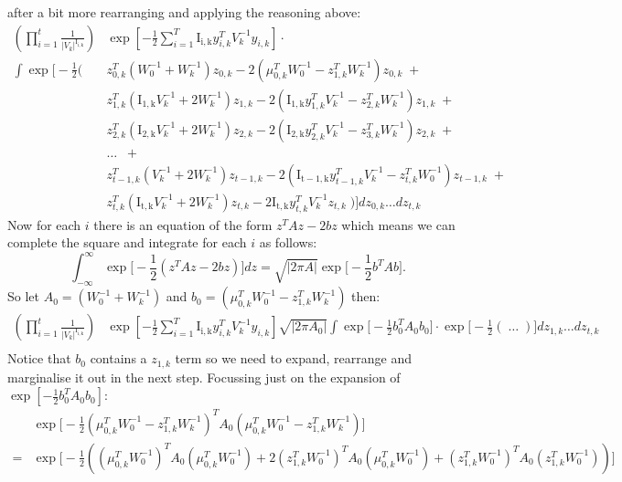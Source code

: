 \documentclass{standalone}
\newcommand{\yik}[1]{y_{#1, k}}
\newcommand{\zik}[1]{z_{#1, k}}
\newcommand{\mik}[1]{\mu_{#1, k}}
\newcommand{\vk}{V_k}
\newcommand{\Ik}[1]{\operatorname{I_{#1, k}}}
\newcommand{\ivk}[1]{V_{#1}^{-1}}
\newcommand{\iwk}[1]{W_{#1}^{-1}}
\DeclareMathOperator{\lint}{\displaystyle\int}
\DeclareMathOperator{\lprod}{\displaystyle\prod}
\begin{document}
after a bit more rearranging and applying the reasoning above:
\begin{align*}
 \left( \lprod_{i = 1}^t \frac{1}{|\vk|^{\Ik{i}}} \right) & \exp \left[-\frac{1}{2} \sum_{i = 1}^T \Ik{i} \yik{i}^T \ivk{k} \yik{i} \right] \cdot \\ 
 \lint \exp \biggl[ -\frac{1}{2} \biggl( & \zik{0}^T \left( \iwk{0} + \iwk{k} \right) \zik{0} - 2 \left(\mik{0}^T \iwk{0}-\zik{1}^T \iwk{k} \right) \zik{0}\; +  \\
 & \zik{1}^T \left(\Ik{1} \ivk{k} + 2 \iwk{k} \right) \zik{1} - 2 \left(\Ik{1} \yik{1}^T \ivk{k} - \zik{2}^T \iwk{k} \right) \zik{1}\; +  \\ 
 & \zik{2}^T \left(\Ik{2} \ivk{k} + 2 \iwk{k} \right) \zik{2} - 2 \left( \Ik{2} \yik{2}^T \ivk{k} - \zik{3}^T \iwk{k} \right) \zik{2}\; +  \\ 
 & \dots \; \; + \\
 & \zik{t-1}^T \left(\ivk{k} + 2 \iwk{k} \right) \zik{t-1} - 2 \left(\Ik{t-1} \yik{t-1}^T \ivk{k} - \zik{t}^T \iwk{0} \right) \zik{t-1}\; +  \\ 
 & \zik{t}^T \left(\Ik{t} \ivk{k} + 2 \iwk{k} \right) \zik{t} - 2 \Ik{t} \yik{t}^T \ivk{k} \zik{t} \; \biggr) \biggr]d\zik{0} \dots d\zik{t}
\end{align*}
Now for each $i$ there is an equation of the form $z^T A z - 2bz$ which means we can complete the square and integrate for each $i$ as follows:
\begin{equation}
\label{eq:comp_sq}
\int_{-\infty}^{\infty} \exp \bigg[-\frac{1}{2} \left(z^T A z - 2bz \right) \bigg]dz = \sqrt{|2 \pi A|} \exp \bigg[-\frac{1}{2} b^T A b \bigg]. 
\end{equation}
So let $A_0 = \left( \iwk{0} + \iwk{k} \right)$ and $b_0 = \left(\mik{0}^T \iwk{0}-\zik{1}^T \iwk{k} \right)$ then:
\begin{align*}
\left( \lprod_{i = 1}^t \frac{1}{|\vk|^{\Ik{i}}} \right) & \exp \left[-\frac{1}{2} \sum_{i = 1}^T \Ik{i} \yik{i}^T \ivk{k} \yik{i} \right] \sqrt{|2 \pi A_0|}    \lint \exp \bigg[-\frac{1}{2} b^T_0 A_0 b_0 \bigg] \cdot \exp \bigg[-\frac{1}{2} \left(\; \dots \; \right) \bigg]d\zik{1} \dots d\zik{t}\\ 
\end{align*}
Notice that $b_0$ contains a $\zik{1}$ term so we need to expand, rearrange and marginalise it out in the next step. Focussing just on the expansion of $\exp \left[-\frac{1}{2} b^T_0 A_0 b_0 \right] $:
\begin{align*}
 & \exp \bigg[ -\frac{1}{2} \left(\mik{0}^T \iwk{0}-\zik{1}^T \iwk{k} \right)^T A_0 \left(\mik{0}^T \iwk{0}-\zik{1}^T \iwk{k} \right) \bigg] \\
  = & \exp \bigg[-\frac{1}{2} \left( \left(\mik{0}^T\iwk{0} \right)^T A_0 \left(\mik{0}^T\iwk{0} \right) + 2 \left(\zik{1}^T\iwk{0} \right)^T A_0 \left(\mik{0}^T\iwk{0} \right) + \left(\zik{1}^T\iwk{0} \right)^T A_0 \left(\zik{1}^T\iwk{0} \right) \right) \bigg]
\end{align*}
\end{document}

